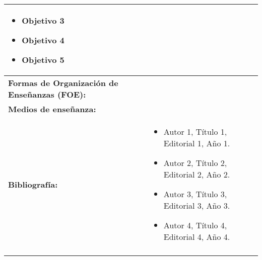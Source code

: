 \begin{xltabular}{\linewidth}{@{}>{\bfseries}X X@{}}
\begin{itemize}
        \item Objetivo 3
        \item Objetivo 4
        \item Objetivo 5
    \end{itemize}               \\
    \midrule
    Formas de Organización de Enseñanzas (FOE): &                               \\
    \midrule
    Medios de enseñanza:                       &                               \\
    \midrule
    Bibliografía:                              & \begin{itemize}
        \item Autor 1, Título 1, Editorial 1, Año 1.
        \item Autor 2, Título 2, Editorial 2, Año 2.
        \item Autor 3, Título 3, Editorial 3, Año 3.
        \item Autor 4, Título 4, Editorial 4, Año 4.
    \end{itemize}                               \\                                         \\
    \bottomrule
\end{xltabular}
\pagebreak